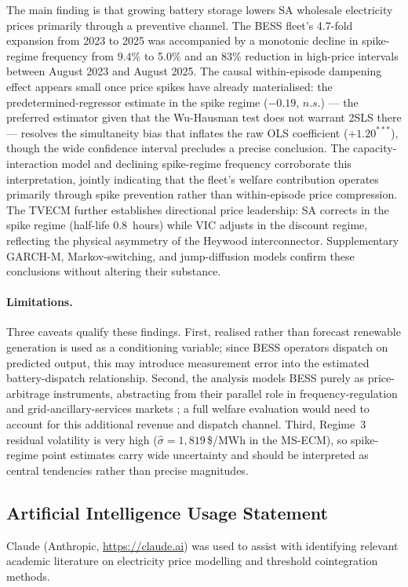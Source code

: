 \documentclass[12pt,a4paper]{article}
\begin{document}
The main finding is that growing battery storage lowers SA wholesale electricity
prices primarily through a preventive channel.  The BESS fleet's 4.7-fold
expansion from 2023 to 2025 was accompanied by a monotonic decline in
spike-regime frequency from 9.4\% to 5.0\% and an 83\% reduction in high-price
intervals between August 2023 and August 2025.  The causal within-episode dampening effect appears small once price spikes have
already materialised: the predetermined-regressor estimate in the spike regime
($-0.19$, $n.s.$) --- the preferred estimator given that the Wu-Hausman test
does not warrant 2SLS there --- resolves the simultaneity bias that inflates
the raw OLS coefficient ($+1.20^{***}$), though the wide confidence interval
precludes a precise conclusion.  The capacity-interaction model and declining
spike-regime frequency corroborate this interpretation, jointly indicating that
the fleet's welfare contribution operates primarily through spike prevention
rather than within-episode price compression.  The TVECM further establishes directional price leadership: SA corrects in the
spike regime (half-life 0.8~hours) while VIC adjusts in the discount regime,
reflecting the physical asymmetry of the Heywood interconnector.
Supplementary GARCH-M, Markov-switching, and jump-diffusion models confirm these
conclusions without altering their substance.

\paragraph{Limitations.}
Three caveats qualify these findings.  First, realised rather than forecast
renewable generation is used as a conditioning variable; since BESS operators
dispatch on predicted output, this may introduce measurement error into the
estimated battery-dispatch relationship.  Second, the analysis models BESS purely
as price-arbitrage instruments, abstracting from their parallel role in
frequency-regulation and grid-ancillary-services markets
\parencite{riesz2016frequency}; a full welfare evaluation would need to account
for this additional revenue and dispatch channel.
Third, Regime~3 residual volatility is very high ($\hat\sigma = 1{,}819$\,\$/MWh
in the MS-ECM), so spike-regime point estimates carry wide uncertainty and should
be interpreted as central tendencies rather than precise magnitudes.

\subsection*{Artificial Intelligence Usage Statement}
\noindent Claude (Anthropic, \url{https://claude.ai}) was used to assist with identifying relevant academic literature on electricity price modelling and threshold cointegration methods.
\end{document}
